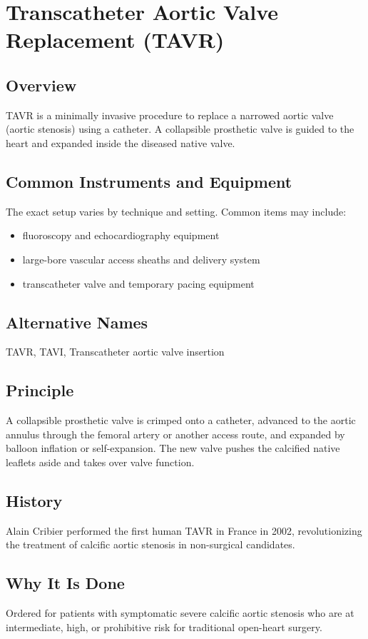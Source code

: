 \chapter{Transcatheter Aortic Valve Replacement (TAVR)}

\section*{Overview}
TAVR is a minimally invasive procedure to replace a narrowed aortic valve (aortic stenosis) using a catheter. A collapsible prosthetic valve is guided to the heart and expanded inside the diseased native valve.

\section*{Common Instruments and Equipment}
The exact setup varies by technique and setting. Common items may include:
\begin{itemize}[nosep,leftmargin=*]
  \item fluoroscopy and echocardiography equipment
  \item large-bore vascular access sheaths and delivery system
  \item transcatheter valve and temporary pacing equipment
\end{itemize}

\section*{Alternative Names}
TAVR, TAVI, Transcatheter aortic valve insertion

\section*{Principle}
A collapsible prosthetic valve is crimped onto a catheter, advanced to the aortic annulus through the femoral artery or another access route, and expanded by balloon inflation or self-expansion. The new valve pushes the calcified native leaflets aside and takes over valve function.
\section*{History}
Alain Cribier performed the first human TAVR in France in 2002, revolutionizing the treatment of calcific aortic stenosis in non-surgical candidates.

\section*{Why It Is Done}
Ordered for patients with symptomatic severe calcific aortic stenosis who are at intermediate, high, or prohibitive risk for traditional open-heart surgery.

